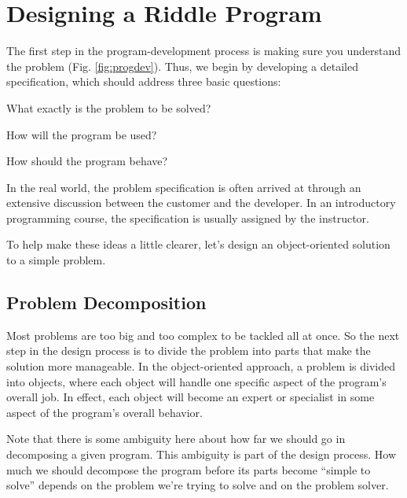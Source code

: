 \section{Designing a Riddle Program}
\label{designinga-riddle-program}

The first step in the program-development process is making sure you
understand the problem (Fig. \ref{fig:progdev}).  Thus, we begin by
developing a detailed specification, which should address three basic
questions:

\begin{BL}
\item  What exactly is the problem to be solved?
\item  How will the program be used?
\item  How should the program behave?
\end{BL}

\noindent In the real world, the problem specification is often
arrived at through an extensive discussion between the customer and
the developer.  In an introductory programming course, the
specification is usually assigned by the instructor.

To help make these ideas a little clearer, let's design an
object-oriented solution to a simple problem.


\subsection{Problem Decomposition}

\noindent Most problems are too big and too complex to be tackled
all at once. So the next step in the design process is to divide the
problem into parts that make the solution more manageable.  In the
object-oriented approach, a problem is divided into objects, where
each object will handle one specific aspect of the program's overall
job. In effect, each object will become an expert or specialist in
some aspect of the program's overall behavior.

Note that there is some ambiguity here about how far we should go in
decomposing a given program.  This ambiguity is part of the design
process.  How much we should decompose the program before its parts
become ``simple to solve'' depends on the problem we're trying to
solve and on the problem solver.

